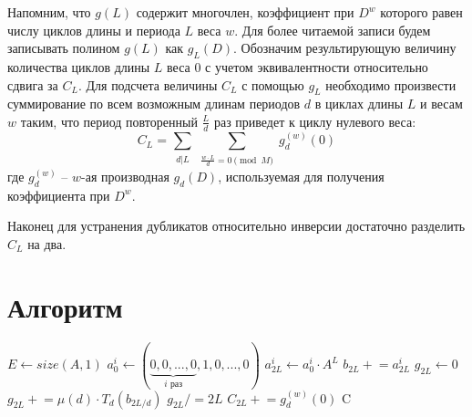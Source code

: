 Напомним, что $g(L)$ содержит многочлен, коэффициент при $D^w$ которого равен числу циклов длины и периода $L$ веса $w$. Для более читаемой записи будем записывать полином $g(L)$ как $g_L(D)$.
Обозначим результирующую величину количества циклов длины $L$ веса 0 с учетом эквивалентности относительно сдвига за $C_L$.
Для подсчета величины $C_L$ с помощью $g_L$ необходимо произвести суммирование по всем возможным длинам периодов $d$ в циклах
длины $L$ и весам $w$ таким, что период повторенный $\frac{L}{d}$ раз приведет к циклу нулевого веса:
\[
  C_L=\sum_{\substack{d|L}}\sum_{\substack{\frac{w \cdot L}{d} = 0 \pmod{M}}}g^{(w)}_d(0)
\]
где $g^{(w)}_d$ -- $w$-ая производная $g_d(D)$, используемая для получения коэффициента при $D^w$.

Наконец для устранения дубликатов относительно инверсии достаточно разделить $C_L$ на два.

\section{Алгоритм}

\renewcommand{\algorithmicrequire}{\textbf{Вход:}}
\renewcommand{\algorithmicensure}{\textbf{Результат:}}
\begin{algorithm}[!h]
\begin{algorithmic}[1]
		\State $E \gets size(A,1)$
			\For{$i \gets [0; E)$}
				\State $a_0^i \gets (\underbrace{0,0,...,0}_{i \text{ раз}},1,0,...,0)$
				\State $a_{2L}^i \gets a_0^i \cdot A^L$ \label{aeq2}
				\State $b_{2L} \mathrel{+}= a_{2L}^i$ \label{aeq3}
			\EndFor
			\State $g_{2L} \gets 0$
				\State $g_{2L} \mathrel{+}= \mu(d) \cdot T_d(b_{2L/d})$
			\EndFor
			\State $g_{2L} /= 2L$
				\For{$w \gets [0; M)$, $\frac{w \cdot 2L}{d}=0\pmod{M}$}
					\State $C_{2L} \mathrel{+}= g^{(w)}_d(0)$ \label{aeq5}
				\EndFor
			\EndFor
		\EndFor
		\State\Return C
	\EndFunction	
\end{algorithmic}
\end{algorithm}


